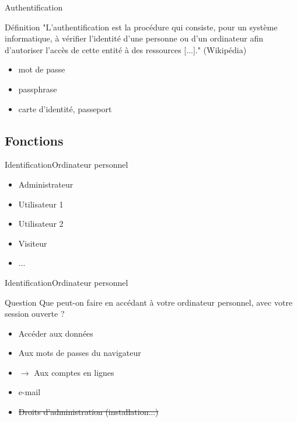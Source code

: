 \documentclass[12pt]{beamer}
\begin{document}
		\begin{frame}{Authentification}
			\onslide<1->
			\begin{exampleblock}{Définition}
				"L'\alert{authentification} est la procédure qui consiste, pour un système informatique, 
				à vérifier l'identité d'une personne ou d'un ordinateur afin d'autoriser l'accès de cette entité 
				à des ressources [...]." (Wikipédia)
			\end{exampleblock}
			\begin{itemize}
				\item mot de passe
				\item passphrase
				\item carte d'identité, passeport
			\end{itemize}
		\end{frame}
		
	\subsection{Fonctions}
		
		\begin{frame}{Identification}{Ordinateur personnel}
			\begin{itemize}
				\item Administrateur
				\item Utilisateur 1
				\item Utilisateur 2
				\item Visiteur
				\item ...
			\end{itemize}
		\end{frame}
		
		\begin{frame}{Identification}{Ordinateur personnel}
			\onslide<1->
			\begin{exampleblock}{Question}
				Que peut-on faire en accédant à votre ordinateur personnel, avec votre session ouverte ?
			\end{exampleblock}
				\begin{itemize}
					\item Accéder aux données
					\item Aux mots de passes du navigateur
					\item $\rightarrow$ Aux comptes en lignes
					\item e-mail
					\onslide<3-> \item \st{Droits d'administration (installation...)}
				\end{itemize}
		\end{frame}
		
\end{document}
